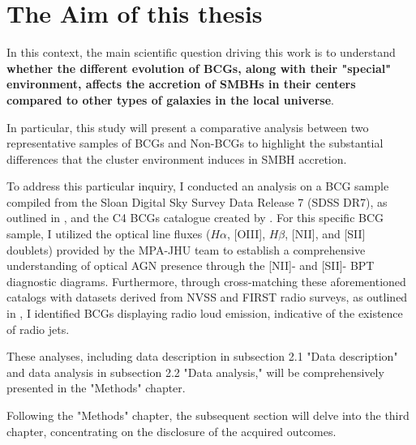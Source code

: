 \newpage
\section{The Aim of this thesis}
In this context, the main scientific question driving this work is to understand \textbf{whether the different evolution of BCGs, along with their "special" environment, affects the accretion of SMBHs in their centers compared to other types of galaxies in the local universe}.

In particular, this study will present a comparative analysis between two representative samples of BCGs and Non-BCGs to highlight the substantial differences that the cluster environment induces in SMBH accretion.


To address this particular inquiry, I conducted an analysis on a BCG sample compiled from the Sloan Digital Sky Survey Data Release 7 (SDSS DR7), as outlined in \cite{2009ApJS..182..543A}, and the C4 BCGs catalogue created by \cite{2007MNRAS.379..867V}. For this specific BCG sample, I utilized the optical line fluxes ($H\alpha$, [OIII], $H\beta$, [NII], and [SII] doublets) provided by the MPA-JHU team to establish a comprehensive understanding of optical AGN presence through the [NII]- and [SII]- BPT diagnostic diagrams. Furthermore, through cross-matching these aforementioned catalogs with datasets derived from NVSS and FIRST radio surveys, as outlined in \cite{2005MNRAS.362....9B}, I identified BCGs displaying radio loud emission, indicative of the existence of radio jets.

These analyses, including data description in subsection 2.1 "Data description" and data analysis in subsection 2.2 "Data analysis," will be comprehensively presented in the "Methods" chapter. 

Following the "Methods" chapter, the subsequent section will delve into the third chapter, concentrating on the disclosure of the acquired outcomes.

